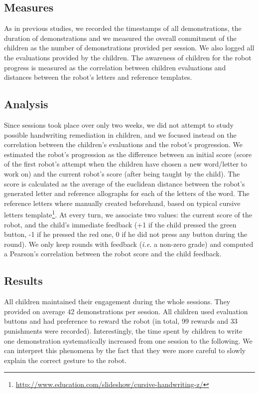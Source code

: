 \documentclass[conference]{IEEEtran}
\newcommand{\ie}{\textit{i.e.}\xspace}
\begin{document}
\subsection{Measures}

As in previous studies, we recorded the timestamps of all demonstrations, the duration of demonstrations and we measured the overall commitment of the children as the number of demonstrations provided per session. 
We also logged all the evaluations provided by the children. The awareness of children for the robot progress is measured as the correlation between children evaluations and distances between the robot's letters and reference templates.

\subsection{Analysis}

Since sessions took place over only two weeks, we did not attempt to study possible
handwriting remediation in children, and we focused instead on the correlation between the children's evaluations and the robot's progression.
We estimated the robot's progression as the difference between an initial score
(score of the first robot's attempt when the children have chosen a new word/letter to
work on) and the current robot's score (after being taught by the child). The
score is calculated as the average of the euclidean
distance between the robot's generated letter and reference allographs for each of the letters of the
word. The reference letters where manually created beforehand, based on typical cursive letters template\footnote{\url{http://www.education.com/slideshow/cursive-handwriting-z/}}. At every turn, we associate two values: the current score of the robot, and the child's immediate feedback (+1 if the child pressed the green button, -1 if he pressed the red one, 0 if he did not press any button during the round). We only keep rounds with feedback (\ie a non-zero grade) and computed a Pearson's correlation between the robot score and the child feedback.

\subsection{Results}

All children maintained their engagement during the whole sessions. They provided
on average 42 demonstrations per session. All children used evaluation buttons and
had preference to reward the robot (in total, 99 rewards and 33 punishments were recorded). Interestingly, the time spent by children to write one demonstration systematically increased from one session to the following. We can interpret this phenomena by the fact that they were more careful to slowly explain the correct gesture to the robot. 
\end{document}
